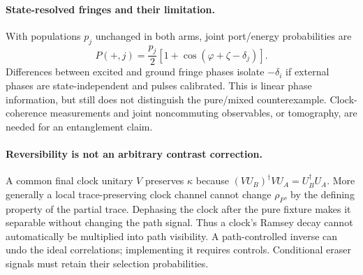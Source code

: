 \documentclass[11pt,a4paper]{article}
\begin{document}
\paragraph{State-resolved fringes and their limitation.}
With populations $p_j$ unchanged in both arms, joint port/energy
probabilities are
\begin{equation}
 P(+,j)=\frac{p_j}{2}
       [1+\cos(\varphi+\zeta-\delta_j)].
\end{equation}
Differences between excited and ground fringe phases isolate $-\delta_i$
if external phases are state-independent and pulses calibrated. This is
linear phase information, but still does not distinguish the pure/mixed
counterexample. Clock-coherence measurements and joint noncommuting
observables, or tomography, are needed for an entanglement claim.

\paragraph{Reversibility is not an arbitrary contrast correction.}
A common final clock unitary $V$ preserves $\kappa$ because
$(VU_B)^\dagger VU_A=U_B^\dagger U_A$.
More generally a local trace-preserving clock channel cannot change
$\rho_P$, by the defining property of the partial trace. Dephasing the
clock after the pure fixture makes it separable without changing the
path signal. Thus a clock's Ramsey decay cannot automatically be
multiplied into path visibility. A path-controlled inverse can undo the
ideal correlations; implementing it requires controls. Conditional
eraser signals must retain their selection probabilities.

\newpage
\end{document}
